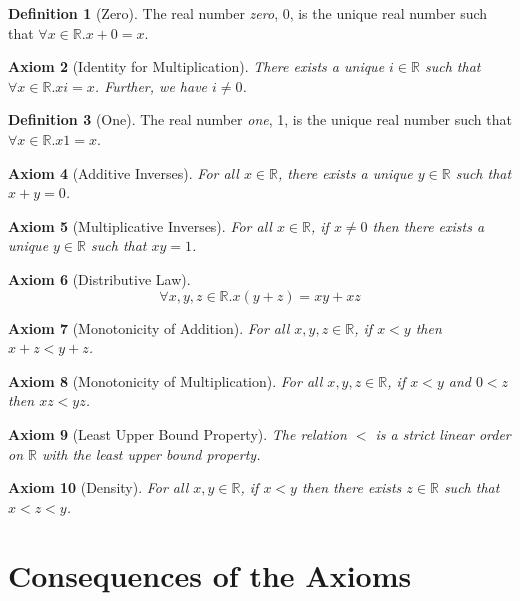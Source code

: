 \documentclass{report}
\newtheorem{ax}{Axiom}[chapter]
\theoremstyle{definition}
\newtheorem{df}[ax]{Definition}
\begin{document}
\begin{df}[Zero]
The real number \emph{zero}, 0, is the unique real number such that $\forall x \in \mathbb{R}. x + 0 = x$.
\end{df}

\begin{ax}[Identity for Multiplication]
There exists a unique $i \in \mathbb{R}$ such that $\forall x \in \mathbb{R}. xi = x$. Further, we have $i \neq 0$.
\end{ax}

\begin{df}[One]
The real number \emph{one}, 1, is the unique real number such that $\forall x \in \mathbb{R}. x 1 = x$.
\end{df}

\begin{ax}[Additive Inverses]
For all $x \in \mathbb{R}$, there exists a unique $y \in \mathbb{R}$ such that $x + y = 0$.
\end{ax}

\begin{ax}[Multiplicative Inverses]
For all $x \in \mathbb{R}$, if $x \neq 0$ then there exists a unique $y \in \mathbb{R}$ such that $xy = 1$.
\end{ax}

\begin{ax}[Distributive Law]
\[ \forall x,y,z \in \mathbb{R}. x(y+z) = xy+xz \]
\end{ax}

\begin{ax}[Monotonicity of Addition]
For all $x,y,z \in \mathbb{R}$, if $x < y$ then $x + z < y + z$.
\end{ax}

\begin{ax}[Monotonicity of Multiplication]
For all $x,y,z \in \mathbb{R}$, if $x < y$ and $0 < z$ then $xz < yz$.
\end{ax}

\begin{ax}[Least Upper Bound Property]
The relation $<$ is a strict linear order on $\mathbb{R}$ with the least upper bound property.
\end{ax}

\begin{ax}[Density]
For all $x,y \in \mathbb{R}$, if $x < y$ then there exists $z \in \mathbb{R}$ such that $x < z < y$.
\end{ax}

\section{Consequences of the Axioms}
\end{document}
